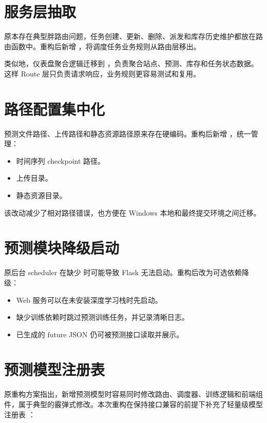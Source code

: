 \section{服务层抽取}

 原本存在典型胖路由问题，任务创建、更新、删除、派发和库存历史维护都放在路由函数中。重构后新增 ，将调度任务业务规则从路由层移出。

类似地，仪表盘聚合逻辑迁移到 ，负责聚合站点、预测、库存和任务状态数据。这样 Route 层只负责请求响应，业务规则更容易测试和复用。

\section{路径配置集中化}

预测文件路径、上传路径和静态资源路径原来存在硬编码。重构后新增 ，统一管理：

\begin{itemize}
  \item 时间序列 checkpoint 路径。
  \item 上传目录。
  \item 静态资源目录。
\end{itemize}

该改动减少了相对路径错误，也方便在 Windows 本地和最终提交环境之间迁移。

\section{预测模块降级启动}

原后台 scheduler 在缺少  时可能导致 Flask 无法启动。重构后改为可选依赖降级：

\begin{itemize}
  \item Web 服务可以在未安装深度学习栈时先启动。
  \item 缺少训练依赖时跳过预测训练任务，并记录清晰日志。
  \item 已生成的 future JSON 仍可被预测接口读取并展示。
\end{itemize}

\section{预测模型注册表}

原重构方案指出，新增预测模型时容易同时修改路由、调度器、训练逻辑和前端组件，属于典型的霰弹式修改。本次重构在保持接口兼容的前提下补充了轻量级模型注册表 ：

